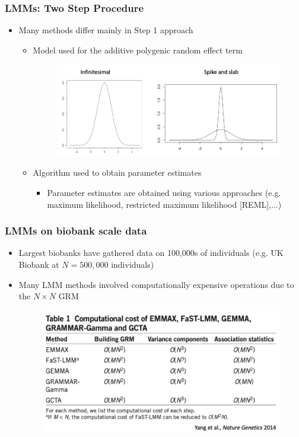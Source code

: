 \documentclass{beamer}
\begin{document}
\begin{frame}
	\frametitle{\bf  LMMs: Two Step Procedure }
	\begin{itemize}
		\item Many methods differ mainly in  Step 1 approach
		\begin{itemize}
			\item Model used for the additive polygenic random effect term
			\begin{figure}
				\includegraphics[scale=.3]{Figures/lmm_priors}
			\end{figure}
			\item Algorithm used to obtain parameter estimates
			\begin{itemize}
				\item  Parameter estimates are obtained using various approaches (e.g. maximum likelihood,  restricted maximum likelihood [REML],...) 
			\end{itemize}
		\end{itemize}
	\end{itemize}
\end{frame}




\begin{frame}
	\frametitle{\bf  LMMs on biobank scale data }
	\begin{itemize}
		\item Largest biobanks have gathered data on 100,000s of individuals (e.g. UK Biobank at $N=500,000$ individuals)
		\item Many LMM methods involved computationally expensive operations due to the $N\times N$ GRM
		\begin{figure}
			\includegraphics[scale=.3]{Figures/lmm_cost}
		\end{figure}
	\end{itemize}
\end{frame}
\end{document}
